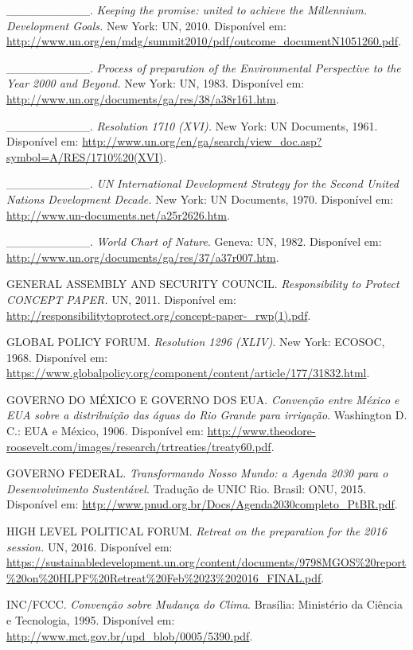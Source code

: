 \_\_\_\_\_\_\_\_\_\_. \emph{Keeping the promise: united to achieve the
Millennium. Development Goals.} New York: UN, 2010. Disponível em:
\url{http://www.un.org/en/mdg/summit2010/pdf/outcome_documentN1051260.pdf}.

\_\_\_\_\_\_\_\_\_\_. \emph{Process of preparation of the Environmental
Perspective to the Year 2000 and Beyond.} New York: UN, 1983. Disponível
em: \url{http://www.un.org/documents/ga/res/38/a38r161.htm}.

\_\_\_\_\_\_\_\_\_\_. \emph{Resolution 1710 (XVI).} New York: UN
Documents, 1961. Disponível em:
\url{http://www.un.org/en/ga/search/view_doc.asp?symbol=A/RES/1710\%20(XVI)}\emph{.}

\_\_\_\_\_\_\_\_\_\_. \emph{UN} \emph{International Development Strategy
for the Second United Nations Development Decade.} New York: UN
Documents, 1970. Disponível em:
\url{http://www.un-documents.net/a25r2626.htm}.

\_\_\_\_\_\_\_\_\_\_. \emph{World Chart of Nature}. Geneva: UN, 1982.
Disponível em: \url{http://www.un.org/documents/ga/res/37/a37r007.htm}.

GENERAL ASSEMBLY AND SECURITY COUNCIL. \emph{Responsibility to Protect
CONCEPT PAPER.} UN, 2011. Disponível em:
\url{http://responsibilitytoprotect.org/concept-paper-_rwp(1).pdf}.

GLOBAL POLICY FORUM. \emph{Resolution 1296 (XLIV)}. New York: ECOSOC,
1968. Disponível em:
\href{https://www.globalpolicy.org/component/content/article/177/31832.html}{{https://www.globalpolicy.org/component/content/article/177/31832.html}}.

GOVERNO DO MÉXICO E GOVERNO DOS EUA. \emph{Convenção entre México e EUA
sobre a distribuição das águas do Rio Grande para irrigação}. Washington
D. C.: EUA e México, 1906. Disponível em:
\url{http://www.theodore-roosevelt.com/images/research/trtreaties/treaty60.pdf}.

GOVERNO FEDERAL. \emph{Transformando Nosso Mundo: a Agenda 2030 para o
Desenvolvimento Sustentável}. Tradução de UNIC Rio. Brasil: ONU, 2015.
Disponível em:
\url{http://www.pnud.org.br/Docs/Agenda2030completo_PtBR.pdf}.

HIGH LEVEL POLITICAL FORUM. \emph{Retreat on the preparation for the
2016 session.} UN, 2016. Disponível em:
\url{https://sustainabledevelopment.un.org/content/documents/9798MGOS\%20report\%20on\%20HLPF\%20Retreat\%20Feb\%2023\%202016_FINAL.pdf}.

INC/FCCC. \emph{Convenção sobre Mudança do Clima}. Brasília: Ministério
da Ciência e Tecnologia, 1995. Disponível em:
\url{http://www.mct.gov.br/upd_blob/0005/5390.pdf}.

